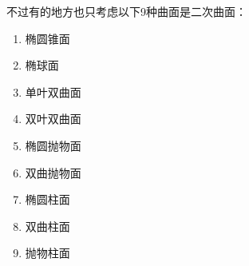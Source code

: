 不过有的地方也只考虑以下9种曲面是二次曲面：
\begin{enumerate}
	\item 椭圆锥面
	\item 椭球面
	\item 单叶双曲面
	\item 双叶双曲面
	\item 椭圆抛物面
	\item 双曲抛物面
	\item 椭圆柱面
	\item 双曲柱面
	\item 抛物柱面
\end{enumerate}

